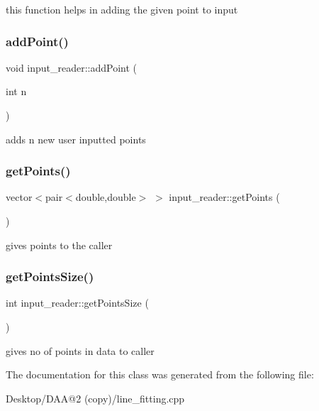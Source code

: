 this function helps in adding the given point to input \mbox{\label{classinput__reader_af90c2628a1731f7948f9026fec919ec7}} 
\subsubsection{\texorpdfstring{add\+Point()}{addPoint()}\hspace{0.1cm}{\footnotesize\ttfamily [2/2]}}
{\footnotesize\ttfamily void input\+\_\+reader\+::add\+Point (\begin{DoxyParamCaption}\item[{int}]{n }\end{DoxyParamCaption})\hspace{0.3cm}{\ttfamily [inline]}}

adds n new user inputted points \mbox{\label{classinput__reader_a8c77c4d25ef4bfe70a1044fcddc427c4}} 
\subsubsection{\texorpdfstring{get\+Points()}{getPoints()}}
{\footnotesize\ttfamily vector$<$pair$<$double,double$>$ $>$ input\+\_\+reader\+::get\+Points (\begin{DoxyParamCaption}{ }\end{DoxyParamCaption})\hspace{0.3cm}{\ttfamily [inline]}}

gives points to the caller \mbox{\label{classinput__reader_a43515656ecf3e997ca8e18fdc20385d8}} 
\subsubsection{\texorpdfstring{get\+Points\+Size()}{getPointsSize()}}
{\footnotesize\ttfamily int input\+\_\+reader\+::get\+Points\+Size (\begin{DoxyParamCaption}{ }\end{DoxyParamCaption})\hspace{0.3cm}{\ttfamily [inline]}}

gives no of points in data to caller 

The documentation for this class was generated from the following file\+:\begin{DoxyCompactItemize}
\item 
Desktop/\+D\+A\+A@2 (copy)/line\+\_\+fitting.\+cpp\end{DoxyCompactItemize}
